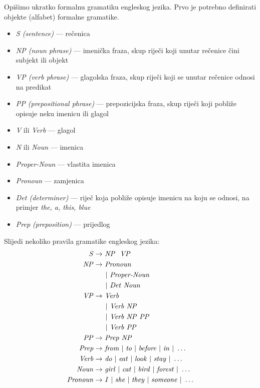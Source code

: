 \documentclass[a4paper,twoside,12pt]{memoir} %
\newcommand{\ti}[1]{\textit{#1\/}}
\begin{document}
	Opišimo ukratko formalnu gramatiku engleskog jezika. Prvo je potrebno definirati objekte (alfabet) formalne gramatike.
	\begin{itemize}[topsep=1.5ex]
		\item	\ti{S (sentence)} --- rečenica
		\item	\ti{NP (noun phrase)} --- imenička fraza, skup riječi koji unutar rečenice čini subjekt ili objekt
		\item	\ti{VP (verb phrase)} --- glagolska fraza, skup riječi koji se unutar rečenice odnosi na predikat
		\item	\ti{PP (prepositional phrase)} --- prepozicijska fraza, skup riječi koji pobliže opisuje neku imenicu ili glagol
		\item	\ti{V} ili \ti{Verb} --- glagol
		\item	\ti{N} ili \ti{Noun} --- imenica
		\item	\ti{Proper-Noun} --- vlastita imenica
		\item	\ti{Pronoun} --- zamjenica
		\item	\ti{Det (determiner)} --- riječ koja pobliže opisuje imenicu na koju se odnosi, na primjer \ti{the, a, this, blue}
		\item	\ti{Prep (preposition)} --- prijedlog
	\end{itemize}
	Slijedi nekoliko pravila gramatike engleskog jezika:
	\begin{equation}
	\begin{aligned}
	\ti{S} \rightarrow &\ \ti{NP} \ \ \ti{VP}\\
	\medskip
	\ti{NP} \rightarrow &\ \ti{Pronoun} \\
	& \;\, |\ \ti{Proper-Noun} \\
	& \;\, |\ \ti{Det}\ \ti{Noun}\\
	\medskip
	\ti{VP} \rightarrow &\ \ti{Verb} \\
	& \;\, |\ \ti{Verb}\ \ti{NP}\\
	& \;\, |\ \ti{Verb}\ \ti{NP}\ \ti{PP}\\
	& \;\, |\ \ti{Verb}\ \ti{PP}\\
	\medskip
	\ti{PP} \rightarrow &\ \ti{Prep}\ \ti{NP} \\
	\medskip
	\ti{Prep} \rightarrow& \ \ti{from} \ |\ \ti{to}\ |\ \ti{before}\ |\ \ti{in} \ |\ \ldots\\
	\ti{Verb} \rightarrow& \ \ti{do} \ |\ \ti{eat}\ |\ \ti{look}\ |\ \ti{stay} \ |\ \ldots\\
	\ti{Noun} \rightarrow& \ \ti{girl} \ |\ \ti{cat}\ |\ \ti{bird}\ |\ \ti{forest} \ |\ \ldots\\
	\ti{Pronoun} \rightarrow& \ \ti{I} \ |\ \ti{she}\ |\ \ti{they}\ |\ \ti{someone} \ |\ \ldots\\
	\end{aligned}
	\end{equation}
\end{document}

